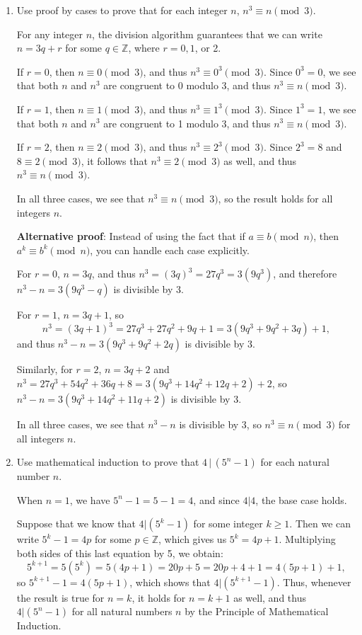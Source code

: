 \documentclass[12pt]{article}
\newcommand{\points}[1]{\marginpar{\hspace{24pt}[#1]}}
\begin{document}
\begin{enumerate}
\vspace{1.5in}


\item Use proof by cases to prove that for each integer $n$, $n^3\equiv n \pmod{3}$.\points{5}

\bigskip

For any integer $n$, the division algorithm guarantees that we can write $n=3q+r$ for some $q\in \mathbb{Z}$, where $r=0, 1$, or 2.

If $r=0$, then $n\equiv 0\pmod{3}$, and thus $n^3\equiv 0^3\pmod{3}$. Since $0^3=0$, we see that both $n$ and $n^3$ are congruent to 0 modulo 3, and thus $n^3\equiv n\pmod{3}$.

If $r=1$, then $n\equiv 1\pmod{3}$, and thus $n^3\equiv 1^3\pmod{3}$. Since $1^3=1$, we see that both $n$ and $n^3$ are congruent to 1 modulo 3, and thus $n^3\equiv n\pmod{3}$.

If $r=2$, then $n\equiv 2\pmod{3}$, and thus $n^3\equiv 2^3\pmod{3}$. Since $2^3=8$ and $8\equiv 2\pmod{3}$, it follows that $n^3\equiv 2\pmod{3}$ as well, and thus $n^3\equiv n\pmod{3}$.

In all three cases, we see that $n^3\equiv n\pmod{3}$, so the result holds for all integers $n$.

\bigskip

{\bf Alternative proof}: Instead of using the fact that if $a\equiv b\pmod{n}$, then $a^k\equiv b^k\pmod{n}$, you can handle each case explicitly. 

For $r=0$, $n=3q$, and thus $n^3=(3q)^3 = 27q^3 = 3(9q^3)$, and therefore $n^3-n = 3(9q^3-q)$ is divisible by 3. 

For $r=1$, $n=3q+1$, so
\[
 n^3 = (3q+1)^3 = 27q^3+27q^2+9q+1 = 3(9q^3+9q^2+3q)+1,
\]
and thus $n^3-n = 3(9q^3+9q^2+2q)$ is divisible by 3. 

Similarly, for $r=2$, $n=3q+2$ and $n^3 = 27q^3+54q^2+36q+8 = 3(9q^3+14q^2+12q+2)+2$, so $n^3-n = 3(9q^3+14q^2+11q+2)$ is divisible by 3. 

In all three cases, we see that $n^3-n$ is divisible by 3, so $n^3\equiv n\pmod{3}$ for all integers $n$.
\newpage

\item Use mathematical induction to prove that $4\,|\,(5^n-1)$ for each natural number $n$. \points{5}

\bigskip

When $n=1$, we have $5^n-1 = 5-1=4$, and since $4|4$, the base case holds.

Suppose that we know that $4|(5^k-1)$ for some integer $k\geq 1$. Then we can write $5^k-1 = 4p$ for some $p\in \mathbb{Z}$, which gives us $5^k=4p+1$. Multiplying both sides of this last equation by 5, we obtain:
\[
 5^{k+1} = 5(5^k) = 5(4p+1) = 20p+5 = 20p+4+1 = 4(5p+1)+1,
\]
so $5^{k+1}-1 = 4(5p+1)$, which shows that $4|(5^{k+1}-1)$. Thus, whenever the result is true for $n=k$, it holds for $n=k+1$ as well, and thus $4|(5^n-1)$ for all natural numbers $n$ by the Principle of Mathematical Induction.


\end{enumerate}
\end{document}
